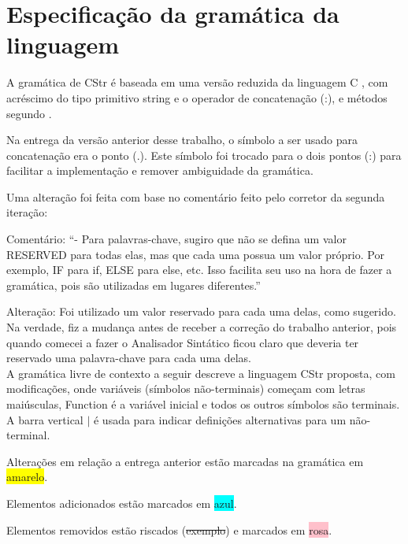 \documentclass[12pt]{article}
\begin{document}
\section{Especificação da gramática da linguagem}

\indent
A gramática de CStr é baseada em uma versão reduzida da linguagem C \cite{minic}, com acréscimo do tipo primitivo string e o operador de concatenação (:), e métodos segundo \cite{cplusplus}.

Na entrega da versão anterior desse trabalho, o símbolo a ser usado para concatenação era o ponto (.). Este símbolo foi trocado para o dois pontos (:) para facilitar a implementação e remover ambiguidade da gramática.

Uma alteração foi feita com base no comentário feito pelo corretor da segunda iteração:

Comentário: ``- Para palavras-chave, sugiro que não se defina um valor RESERVED para todas elas, mas que cada uma possua um valor próprio. Por exemplo, IF para if, ELSE para else, etc. Isso facilita seu uso na hora de fazer a gramática, pois são utilizadas em lugares diferentes.''

Alteração: Foi utilizado um valor reservado para cada uma delas, como sugerido. Na verdade, fiz a mudança antes de receber a correção do trabalho anterior, pois quando comecei a fazer o Analisador Sintático ficou claro que deveria ter reservado uma palavra-chave para cada uma delas.\\

A gramática livre de contexto a seguir descreve a linguagem CStr proposta, com modificações, onde variáveis (símbolos não-terminais) começam com letras maiúsculas, Function é a variável inicial e todos os outros símbolos são terminais. A barra vertical $|$ é usada para indicar definições alternativas para um não-terminal.

Alterações em relação a entrega anterior estão marcadas na gramática em \colorbox{yellow}{amarelo}.

Elementos adicionados estão marcados em \colorbox{cyan}{azul}.

Elementos removidos estão riscados (\sout{exemplo}) e marcados em \colorbox{pink}{rosa}.\\
\end{document}
